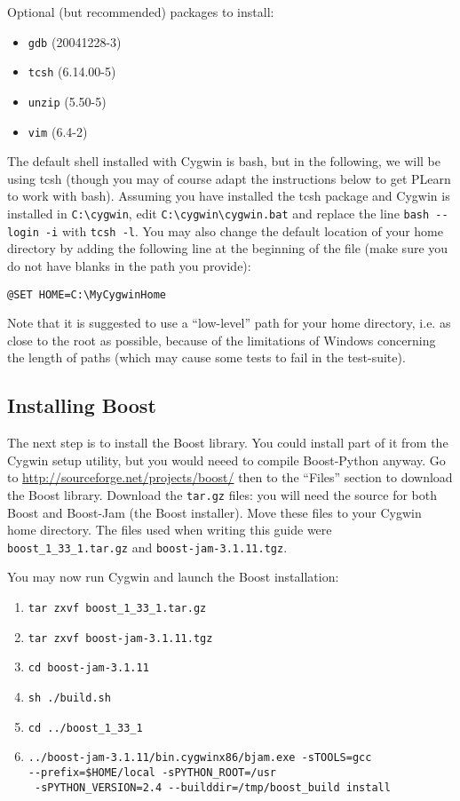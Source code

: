 \documentclass[11pt]{book}
\begin{document}
Optional (but recommended) packages to install:
\begin{itemize}
\item \verb!gdb! (20041228-3)
\item \verb!tcsh! (6.14.00-5)
\item \verb!unzip! (5.50-5)
\item \verb!vim! (6.4-2)
\end{itemize}

The default shell installed with Cygwin is bash, but in the following, we will
be using tcsh (though you may of course adapt the instructions below to get PLearn to
work with bash). Assuming you have installed the tcsh package and Cygwin is
installed in \verb!C:\cygwin!, edit \verb!C:\cygwin\cygwin.bat! and replace
the line \verb!bash --login -i! with \verb!tcsh -l!.
You may also change the default location of your home directory by adding the
following line at the beginning of the file (make sure you do not have blanks
in the path you provide):
\begin{verbatim}
@SET HOME=C:\MyCygwinHome
\end{verbatim}

Note that it is suggested to use a ``low-level'' path for your home directory, i.e. as close
to the root as possible, because of the limitations of Windows concerning the
length of paths (which may cause some tests to fail in the test-suite).

\subsection{Installing Boost}
The next step is to install the Boost library.
You could install part of it from the Cygwin setup utility, but you would
neeed to compile Boost-Python anyway.
Go to \url{http://sourceforge.net/projects/boost/} then to the ``Files'' section
to download
the Boost library. Download the \verb!tar.gz! files:
you will need the source for both Boost and Boost-Jam (the Boost installer).
Move these files to your Cygwin home directory.
The files used when writing this guide were \verb!boost_1_33_1.tar.gz!
and \verb!boost-jam-3.1.11.tgz!.

You may now run Cygwin and launch the Boost installation:
\begin{enumerate}
\item \verb!tar zxvf boost_1_33_1.tar.gz!
\item \verb!tar zxvf boost-jam-3.1.11.tgz!
\item \verb!cd boost-jam-3.1.11!
\item \verb!sh ./build.sh!
\item \verb!cd ../boost_1_33_1!
\item \verb!../boost-jam-3.1.11/bin.cygwinx86/bjam.exe -sTOOLS=gcc! \\
\verb!--prefix=$HOME/local -sPYTHON_ROOT=/usr! \\
\verb! -sPYTHON_VERSION=2.4 --builddir=/tmp/boost_build install!
\end{enumerate}
\end{document}
